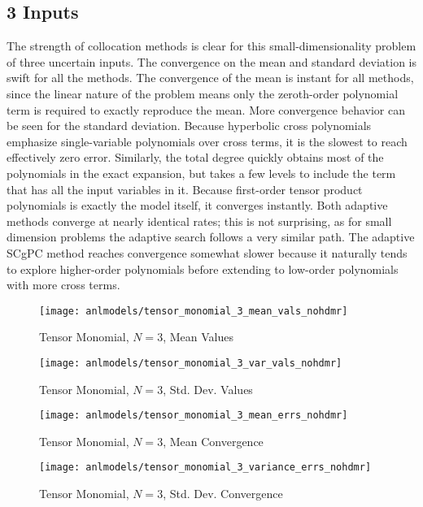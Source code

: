\subsection{3 Inputs}
The strength of collocation methods is clear for this small-dimensionality problem of three uncertain inputs.
The convergence on the
mean and standard deviation is swift for all the methods.  The convergence of the mean is instant for all methods, since
the linear nature of the problem means only the zeroth-order polynomial term is required to exactly reproduce the mean.
More convergence behavior can be seen for the standard deviation.
Because hyperbolic cross polynomials emphasize single-variable polynomials over cross terms, it is the slowest to reach
effectively zero error.  Similarly, the total degree quickly obtains most of the polynomials in the exact expansion,
but takes a few levels to include the term that has all the input variables in it.  Because first-order tensor product
polynomials is exactly the model itself, it converges instantly.
Both adaptive methods converge at nearly identical
rates; this is not surprising, as for small dimension problems the adaptive search follows a very similar
path.  The adaptive SCgPC method reaches convergence somewhat slower because it naturally tends to explore
higher-order polynomials before extending to low-order polynomials with more cross terms.
\begin{figure}[H]
  \centering
  \texttt{[image: anlmodels/tensor\_monomial\_3\_mean\_vals\_nohdmr]}
  \caption{Tensor Monomial, $N=3$, Mean Values}
  \label{fig:tensormono mean values 3}
\end{figure}
\begin{figure}[H]
  \centering
  \texttt{[image: anlmodels/tensor\_monomial\_3\_var\_vals\_nohdmr]}
  \caption{Tensor Monomial, $N=3$, Std. Dev. Values}
  \label{fig:tensormono var values 3}
\end{figure}

\begin{figure}[H]
  \centering
  \texttt{[image: anlmodels/tensor\_monomial\_3\_mean\_errs\_nohdmr]}
  \caption{Tensor Monomial, $N=3$, Mean Convergence}
  \label{fig:tensormono mean errors 3}
\end{figure}
\begin{figure}[H]
  \centering
  \texttt{[image: anlmodels/tensor\_monomial\_3\_variance\_errs\_nohdmr]}
  \caption{Tensor Monomial, $N=3$, Std. Dev. Convergence}
  \label{fig:tensormono var errors 3}
\end{figure}




